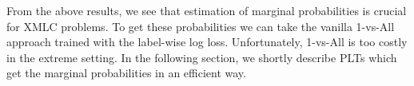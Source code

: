 \documentclass{article}
\renewcommand{\vec}[1]{\boldsymbol{#1}}
\newcommand{\bx}{\vec{x}}
\newcommand{\by}{\vec{y}}
\newcommand{\bw}{\vec{w}}
\newcommand{\calD}{\mathcal{D}}
\newcommand{\calW}{\mathcal{W}}
\newcommand\R{\mathbb{R}}   %
\newcommand{\bc}{\mathbf{c}}
\newcommand{\bd}{\mathbf{d}}
\begin{document}
From the above results, we see that estimation of marginal probabilities is crucial for XMLC problems. To get these probabilities we can take the vanilla 1-vs-All approach trained with the label-wise log loss. Unfortunately, 1-vs-All is too costly in the extreme setting. In the following section, we shortly describe PLTs which get the marginal probabilities in an efficient way. 

%
%
%
%
\end{document}
